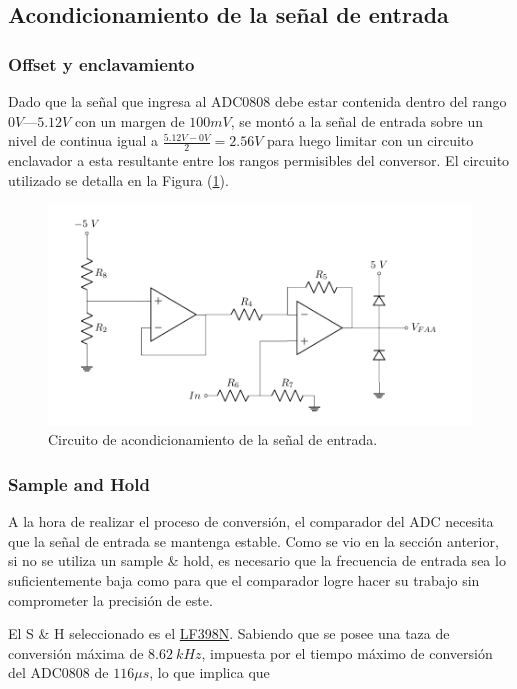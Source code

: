 \subsection{Acondicionamiento de la señal de entrada}

\subsubsection{Offset y enclavamiento}

Dado que la señal que ingresa al ADC0808 debe estar contenida dentro del rango $0V$—$5.12V$ con un margen de $100mV$, se montó a la señal de entrada sobre un nivel de continua igual a $\frac{5.12V - 0V}{2} = 2.56V$ para luego limitar con un circuito enclavador a esta resultante entre los rangos permisibles del conversor. El circuito utilizado se detalla en la Figura (\ref{ACOND}).

\begin{figure}[H]
\centering
\includegraphics[width=0.8\linewidth]{ImagenesEjercicio1/ada.pdf}
\caption{Circuito de acondicionamiento de la señal de entrada.}
\label{ACOND}
\end{figure}

\subsubsection{Sample and Hold}

A la hora de realizar el proceso de conversión, el comparador del ADC necesita que la señal de entrada se mantenga estable. Como se vio en la sección anterior, si no se utiliza un sample & hold, es necesario que la frecuencia de entrada sea lo suficientemente baja como para que el comparador logre hacer su trabajo sin comprometer la precisión de este.

El S \& H seleccionado es el \href{https://pdf1.alldatasheet.es/datasheet-pdf/view/8580/NSC/LF398N.html}{LF398N}. Sabiendo que se posee una taza de conversión máxima de $8.62 \ kHz$, impuesta por el tiempo máximo de conversión del ADC0808 de $116 \mu s$, lo que implica que

